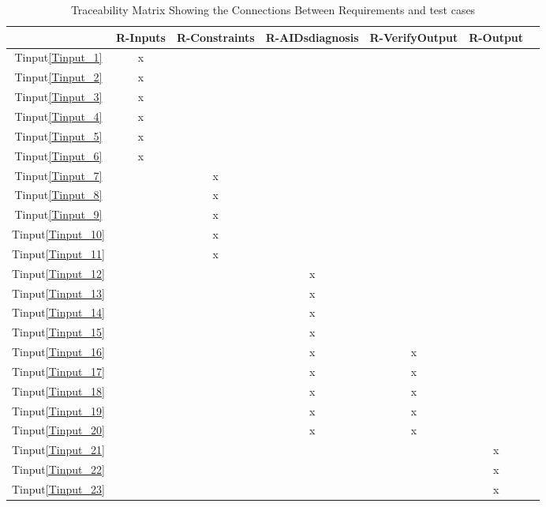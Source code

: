 \documentclass[12pt, titlepage]{article}
\newcommand{\tinref}[1]{Tinput\ref{#1}}
\begin{document}
\begin{landscape}
\begin{table}[ht]
\centering
\begin{tabular}{|c|c|c|c|c|c|c|}
\hline
	& R-Inputs & R-Constraints & R-AIDsdiagnosis & R-VerifyOutput 
& R-Output\\
\hline
\tinref{Tinput_1}        	&x & & & &  \\ 
\hline
\tinref{Tinput_2}			&x & & & &   \\ 
\hline
\tinref{Tinput_3}        	&x & & & &  \\ 
\hline
\tinref{Tinput_4}			&x & & & &   \\ 
\hline
\tinref{Tinput_5}        	&x & & & &  \\ 
\hline
\tinref{Tinput_6}			&x & & & &   \\ 
\hline
\tinref{Tinput_7}        	& &x & & &  \\ 
\hline
\tinref{Tinput_8}			& &x & & &   \\ 
\hline
\tinref{Tinput_9}        	& &x & & &  \\ 
\hline
\tinref{Tinput_10}			& &x & & &   \\ 
\hline
\tinref{Tinput_11}        	& &x & & &  \\ 
\hline
\tinref{Tinput_12}			& & &x & &   \\ 
\hline
\tinref{Tinput_13}        	& & &x & &  \\ 
\hline
\tinref{Tinput_14}			& & &x & &   \\ 
\hline
\tinref{Tinput_15}        	& & &x & &   \\  
\hline
\tinref{Tinput_16}			& & &x &x & \\ 
\hline
\tinref{Tinput_17}        	& & &x &x &   \\ 
\hline
\tinref{Tinput_18}			& & &x &x &   \\  
\hline
\tinref{Tinput_19}        	& & &x &x &   \\  
\hline
\tinref{Tinput_20}			& & &x &x &   \\  
\hline
\tinref{Tinput_21}        	& & & & &x  \\ 
\hline
\tinref{Tinput_22}			& & & & &x   \\ 
\hline
\tinref{Tinput_23}        	& & & & &x  \\ 
\hline
\end{tabular}
\caption{Traceability Matrix Showing the Connections Between Requirements and 
test cases}
\label{Table:R_trace}
\end{table}
\end{landscape}
\end{document}
